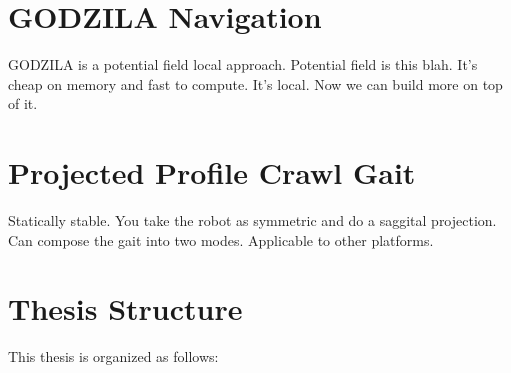 \section{GODZILA Navigation}
GODZILA is a potential field local approach.
Potential field is this blah.
It's cheap on memory and fast to compute.
It's local. Now we can build more on top of it.

\section{Projected Profile Crawl Gait}
Statically stable.
You take the robot as symmetric and do a saggital projection.
Can compose the gait into two modes.
Applicable to other platforms.

\section{Thesis Structure}
This thesis is organized as follows: 

